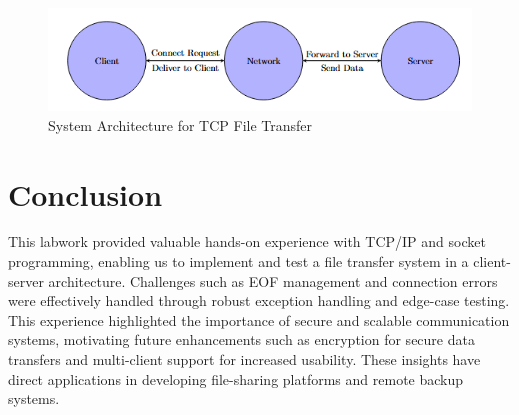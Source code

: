\documentclass{article}
\begin{document}
\begin{figure}
    \centering
    \includegraphics[width=1\linewidth]{system_architecture.png}
    \caption{System Architecture for TCP File Transfer}
    \label{fig:enter-label}
\end{figure}

\section{Conclusion}
This labwork provided valuable hands-on experience with TCP/IP and socket programming, enabling us to implement and test a file transfer system in a client-server architecture. Challenges such as EOF management and connection errors were effectively handled through robust exception handling and edge-case testing. This experience highlighted the importance of secure and scalable communication systems, motivating future enhancements such as encryption for secure data transfers and multi-client support for increased usability. These insights have direct applications in developing file-sharing platforms and remote backup systems.
\end{document}
